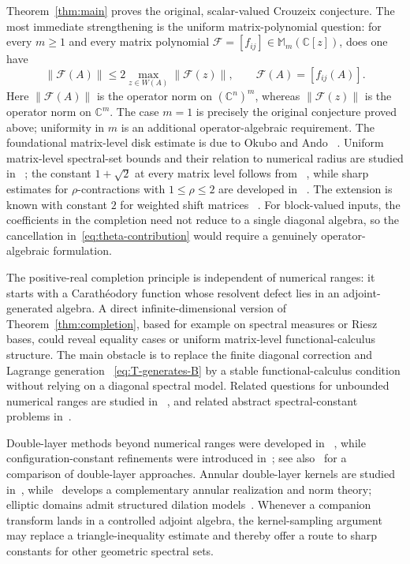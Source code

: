 \documentclass{aomart}
\theoremstyle{definition}
\newcommand{\C}{\mathbb C}
\begin{document}
Theorem~\ref{thm:main} proves the original, scalar-valued Crouzeix
conjecture.  The most immediate strengthening is the uniform
matrix-polynomial question: for every
$m\geq1$ and every matrix polynomial
$\mathcal F=[f_{ij}]\in\mathbb M_m(\C[z])$, does one have
\begin{equation}
  \lVert\mathcal F(A)\rVert
  \leq2\max_{z\in W(A)}\lVert\mathcal F(z)\rVert,
  \qquad \mathcal F(A)=[f_{ij}(A)].
  \label{eq:uniform-matrix-polynomial-extension}
\end{equation}
Here $\lVert\mathcal F(A)\rVert$ is the operator norm on $(\C^n)^m$,
whereas $\lVert\mathcal F(z)\rVert$ is the operator norm on $\C^m$.
The case $m=1$ is precisely the original conjecture proved above;
uniformity in $m$ is an additional operator-algebraic requirement.  The
foundational matrix-level disk estimate is due to Okubo and Ando~%
\cite{OkuboAndo1975}.  Uniform matrix-level spectral-set bounds and
their relation to numerical radius are studied in~%
\cite{DavidsonPaulsenWoerdeman2018,HartzMcCarthy2026}; the constant
$1+\sqrt2$ at every matrix level follows from~%
\cite{CrouzeixPalencia2017}, while sharp estimates for
$\rho$-contractions with $1\leq\rho\leq2$ are developed in~%
\cite{SchwenningerDeVriesRho2025}.  The extension is
known with constant $2$ for weighted shift matrices~%
\cite{CrouzeixGreenbaum2025}.  For block-valued inputs, the coefficients
in the completion need not reduce to a single diagonal algebra, so the
cancellation in~\eqref{eq:theta-contribution} would require a genuinely
operator-algebraic formulation.

The positive-real completion principle is independent of numerical
ranges: it starts with a Carath\'eodory function whose resolvent defect
lies in an adjoint-generated algebra.  A direct infinite-dimensional
version of Theorem~\ref{thm:completion},
based for example on spectral measures or Riesz bases, could reveal
equality cases or uniform matrix-level functional-calculus structure.
The main obstacle is to
replace the finite diagonal correction and Lagrange generation~%
\eqref{eq:T-generates-B} by a stable functional-calculus condition
without relying on a diagonal spectral model.
Related questions for unbounded numerical ranges are studied in~%
\cite{CrouzeixUnbounded2025}, and related abstract spectral-constant
problems in~\cite{SchwenningerDeVries2024,BlazhkoEtAl2025}.

Double-layer methods beyond numerical ranges were developed in~%
\cite{CrouzeixGreenbaum2019}, while configuration-constant refinements
were introduced in~\cite{MalmanEtAl2025}; see also~%
\cite{SchwenningerDeVries2025} for a comparison of double-layer
approaches.
Annular double-layer kernels are studied in~\cite{JuryTsikalas2024},
while~\cite{AglerLykovaYoung2025} develops a complementary annular
realization and norm theory; elliptic domains admit structured dilation
models~\cite{AglerLykovaYoung2024}.  Whenever a companion transform
lands in a controlled adjoint algebra, the kernel-sampling argument may
replace a triangle-inequality estimate and thereby offer a route to
sharp constants for other geometric spectral sets.
\end{document}
